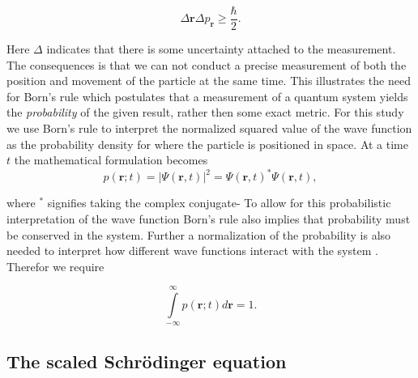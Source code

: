 \documentclass[../main_proj5.tex]{subfiles}
\begin{document}
\begin{equation}
\label{eq:p5_heisenberg_uncertainty}
    \Delta \mathbf{r} \Delta p_\mathbf{r} \geq \frac{\hbar}{2} .
\end{equation}

\noindent Here $\Delta$ indicates that there is some uncertainty attached to the measurement. The consequences is that we can not conduct a precise measurement of both the position and movement of the particle at the same time. This illustrates the need for Born's rule which postulates that a measurement of a quantum system yields the \textit{probability} of the given result, rather then some exact metric. For this study we use Born's rule to interpret the normalized squared value of the wave function as the probability density for where the particle is positioned in space. At a time $t$ the mathematical formulation becomes
\begin{equation}
\label{eq:p5_borns_rule_positionspace}
    p(\mathbf{r}; t) = |\Psi(\mathbf{r}, t)|^{2} = \Psi(\mathbf{r}, t)^* \Psi(\mathbf{r}, t) , 
\end{equation}

\noindent where $^*$ signifies taking the complex conjugate- To allow for this probabilistic interpretation of the wave function Born's rule also implies that probability must be conserved in the system. Further a normalization of the probability is also needed to interpret how different wave functions interact with the system \cite{townsend2010quantum}. Therefor we require 

\begin{equation}
\label{eq:p5_normalization_condition}
    \int\limits_{-\infty}^{\infty} p(\mathbf{r;} t)d\mathbf{r} = 1 .
\end{equation}







\subsection{The scaled Schr\"odinger equation}
\end{document}
